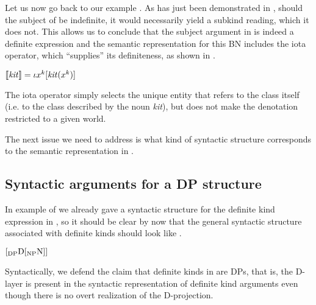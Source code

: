 \documentclass[output=paper
,modfonts
,nonflat]{langsci/langscibook}
\begin{document}
	Let us now go back to our example . As has just been demonstrated in , should the subject of  be indefinite, it would necessarily yield a subkind reading, which it does not. This allows us to conclude that the subject argument in  is indeed a definite expression and the semantic representation for this BN includes the iota operator, which ``supplies'' its definiteness, as shown in .
	
	\ea \label{ex:borik:13}
	$[\![\text{\textit{kit}}]\!] = \iota{x^k}[\mbox{\textit{kit}}(x^k)]$
	\z
	
	The iota operator simply selects the unique entity that refers to the class itself (i.e. to the class described by the noun \textit{kit}), but does not make the denotation restricted to a given world. 
	
	The next issue we need to address is what kind of syntactic structure corresponds to the semantic representation in . 
	
	\subsection{Syntactic arguments for a DP structure} \label{sec:borik:3.2}
	
	In example  of  we already gave a syntactic structure for the definite kind expression in , so it should be clear by now that the general syntactic structure associated with definite kinds should look like . 
	
	\ea\label{ex:borik:14}
	$[_{\mbox{\scriptsize{DP}}} \mbox{D} [_{\mbox{\scriptsize{NP}}} \mbox{N}]]$
	\z
	
	Syntactically, we defend the claim that definite kinds in  are DPs, that is, the D-layer is present in the syntactic representation of definite kind arguments even though there is no overt realization of the D-projection. 
	
\end{document}
